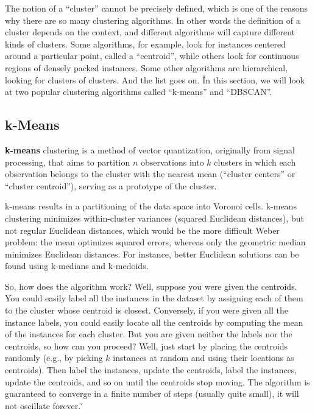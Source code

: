 The notion of a ``cluster'' cannot be precisely defined, which is one of the reasons why there are so many clustering
algorithms. In other words the definition of a cluster depends on the context, and different algorithms will capture
different kinds of clusters. Some algorithms, for example, look for instances centered around a particular point, 
called a ``centroid'', while others look for continuous regions of densely packed instances. Some other algorithms are
hierarchical, looking for clusters of clusters. And the list goes on. \v

In this section, we will look at two popular clustering algorithms called ``k-means'' and ``DBSCAN''.

\subsection{k-Means}

\bd[k-Means]
\textbf{k-means} clustering is a method of vector quantization, originally from signal processing, that aims to 
partition $n$ observations into $k$ clusters in which each observation belongs to the cluster with the nearest mean 
(``cluster centers'' or ``cluster centroid''), serving as a prototype of the cluster.
\ed

k-means results in a partitioning of the data space into Voronoi cells. k-means clustering minimizes within-cluster 
variances (squared Euclidean distances), but not regular Euclidean distances, which would be the more difficult 
Weber problem: the mean optimizes squared errors, whereas only the geometric median minimizes Euclidean distances. 
For instance, better Euclidean solutions can be found using k-medians and k-medoids.


So, how does the algorithm work? Well, suppose you were given the centroids. You could easily label all the 
instances in the dataset by assigning each of them to the cluster whose centroid is closest. Conversely, if you were
given all the instance labels, you could easily locate all the centroids by computing the mean of the instances for 
each cluster. But you are given neither the labels nor the centroids, so how can you proceed? Well, just start by 
placing the centroids randomly (e.g., by picking $k$ instances at random and using their locations as centroids). 
Then label the instances, update the centroids, label the instances, update the centroids, and so on until the 
centroids stop moving. The algorithm is guaranteed to converge in a finite number of steps (usually quite small), it 
will not oscillate forever. \v

